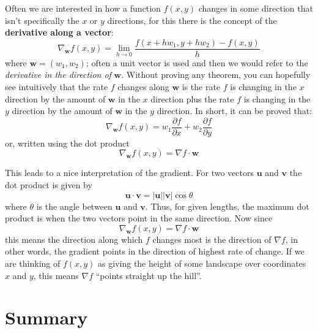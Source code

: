 \documentclass[12pt]{article}
\begin{document}
Often we are interested in how a function $f(x,y)$ changes in some
direction that isn't specifically the $x$ or $y$ directions, for this
there is the concept of the \textbf{derivative along a vector}:
\begin{equation}
  \nabla_{\mathbf{w}}f(x,y)=\lim_{h\rightarrow 0}\frac{f(x+hw_1,y+hw_2)-f(x,y)}{h}
\end{equation}
where $\mathbf{w}=(w_1,w_2)$; often a unit vector is used and then we
would refer to the \textsl{derivative in the direction of}
$\textbf{w}$. Without proving any theorem, you can hopefully see
intuitively that the rate $f$ changes along $\textbf{w}$ is the rate
$f$ is changing in the $x$ direction by the amount of $\textbf{w}$ in
the $x$ direction plus the rate $f$ is changing in the $y$ direction
by the amount of $\textbf{w}$ in the $y$ direction. In short, it can
be proved that:
\begin{equation}
  \nabla_{\mathbf{w}}f(x,y)=w_1\frac{\partial f}{\partial x}+w_2\frac{\partial f}{\partial y}
\end{equation}
or, written using the dot product
\begin{equation}
  \nabla_{\mathbf{w}}f(x,y)=\nabla f\cdot \textbf{w}
\end{equation}

This leads to a nice interpretation of the gradient. For two vectors
$\textbf{u}$ and $\textbf{v}$ the dot product is given by
\begin{equation}
  \textbf{u}\cdot\textbf{v}=|\textbf{u}||\textbf{v}|\cos{\theta}
\end{equation}
where $\theta$ is the angle between $\textbf{u}$ and
$\textbf{v}$. Thus, for given lengths, the maximum dot product is when
the two vectors point in the same direction. Now since
\begin{equation}
  \nabla_{\mathbf{w}}f(x,y)=\nabla f\cdot \textbf{w}
\end{equation}
this means the direction along which $f$ changes most is the direction
of $\nabla f$, in other words, the gradient points in the direction of
highest rate of change. If we are thinking of $f(x,y)$ as giving the
height of some landscape over coordinates $x$ and $y$, this means
$\nabla f$ ``points straight up the hill''.








\section*{Summary}
\end{document}

